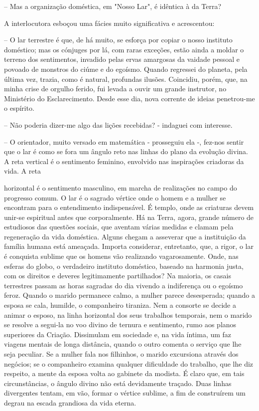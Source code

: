 \documentclass[portuguese,12pt,a4paper]{scrbook}
\begin{document}
	– Mas a organização doméstica, em "Nosso Lar", é idêntica à da Terra?
	
	A interlocutora esboçou uma fácies muito significativa e acrescentou:
	
	– O lar terrestre é que, de há muito, se esforça por copiar o nosso instituto doméstico; mas os cónjuges por lá, com raras exceções, estão ainda a moldar o terreno dos sentimentos, invadido pelas ervas amargosas da vaidade pessoal e povoado de monstros do ciúme e do egoísmo. Quando regressei do planeta, pela última vez, trazia, como é natural, profundas ilusões. Coincidiu, porém, que, na minha crise de orgulho ferido, fui levada a ouvir um grande instrutor, no Ministério do Esclarecimento. Desde esse dia, nova corrente de ideias penetrou-me o espírito.
	
	– Não poderia dizer-me algo das lições recebidas? - indaguei com interesse.
	
	– O orientador, muito versado em matemática - prosseguiu ela -, fez-nos sentir que o lar é como se fora um ângulo reto nas linhas do plano da evolução divina. A reta vertical é o sentimento feminino, envolvido nas inspirações criadoras da vida. A reta
	
	
	horizontal é o sentimento masculino, em marcha de realizações no campo do progresso comum. O lar é o sagrado vértice onde o homem e a mulher se encontram para o entendimento indispensável. É templo, onde as criaturas devem unir-se espiritual antes que corporalmente. Há na Terra, agora, grande número de estudiosos das questões sociais, que aventam várias medidas e clamam pela regeneração da vida doméstica. Alguns chegam a asseverar que a instituição da família humana está ameaçada. Importa considerar, entretanto, que, a rigor, o lar é conquista sublime que os homens vão realizando vagarosamente. Onde, nas esferas do globo, o verdadeiro instituto doméstico, baseado na harmonia justa, com os direitos e deveres legitimamente partilhados? Na maioria, os casais terrestres passam as horas sagradas do dia vivendo a indiferença ou o egoísmo feroz. Quando o marido permanece calmo, a mulher parece desesperada; quando a esposa se cala, humilde, o companheiro tiraniza. Nem a consorte se decide a animar o esposo, na linha horizontal dos seus trabalhos temporais, nem o marido se resolve a segui-la no voo divino de ternura e sentimento, rumo aos planos superiores da Criação. Dissimulam em sociedade e, na vida íntima, um faz viagens mentais de longa distância, quando o outro comenta o serviço que lhe seja peculiar. Se a mulher fala nos filhinhos, o marido excursiona através dos negócios; se o companheiro examina qualquer dificuldade do trabalho, que lhe diz respeito, a mente da esposa volta ao gabinete da modista. É claro que, em tais circunstâncias, o ângulo divino não está devidamente traçado. Duas linhas divergentes tentam, em vão, formar o vértice sublime, a fim de construírem um degrau na escada grandiosa da vida eterna.
	
\end{document}
